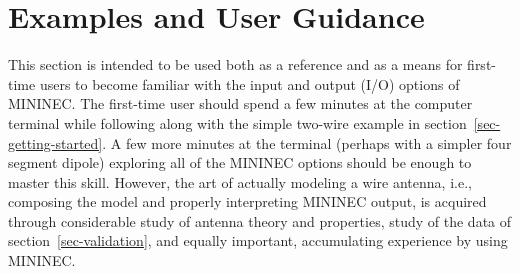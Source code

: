 \documentclass[12pt]{article}
\begin{document}
\section{Examples and User Guidance}
This section is intended to be used both as a reference and as a means
for first-time users to become familiar with the input and output (I/O)
options of MININEC. The first-time user should spend a few minutes at
the computer terminal while following along with the simple two-wire
example in section~\ref{sec-getting-started}. A few more minutes at the
terminal (perhaps with a simpler four segment dipole) exploring all of
the MININEC options should be enough to master this skill. However, the
art of actually modeling a wire antenna, i.e., composing the model and
properly interpreting MININEC output, is acquired through considerable
study of antenna theory and properties, study of the data of
section~\ref{sec-validation}, and equally important, accumulating
experience by using MININEC.
\end{document}
